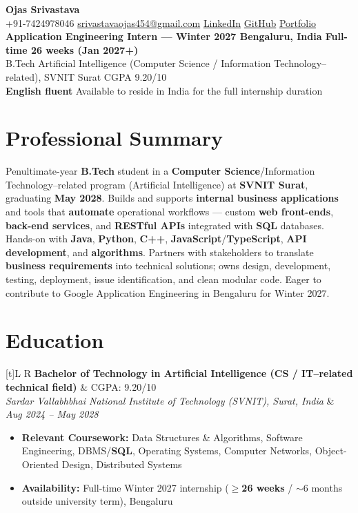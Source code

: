 \documentclass[a4paper,10pt]{article}
\newcommand{\resumeSubheading}[4]{%
  \vspace{0.4mm}
  \noindent
  \begin{tabularx}{\textwidth}[t]{L R}
    \textbf{#1} & #4 \\
    \textit{#3} & \textit{#2} \\
  \end{tabularx}
  \vspace{-0.3mm}%
}
\begin{document}
\selectfont

\begin{center}
  {\LARGE \textbf{Ojas Srivastava}} \\[0.8mm]
  \small
  +91-7424978046 \textbar{}
  \href{mailto:srivastavaojas454@gmail.com}{srivastavaojas454@gmail.com} \textbar{}
  \href{https://linkedin.com/in/ojas-srivastava05}{LinkedIn} \textbar{}
  \href{https://github.com/Ojas-Srivastava05}{GitHub} \textbar{}
  \href{https://ojas-srivastava.vercel.app}{Portfolio} \\[0.4mm]
  \textbf{Application Engineering Intern --- Winter 2027 \textbar{} Bengaluru, India \textbar{} Full-time 26 weeks (Jan 2027+)} \\[0.25mm]
  B.Tech Artificial Intelligence (Computer Science / Information Technology--related), SVNIT Surat \textbar{} CGPA 9.20/10 \\[0.2mm]
  \textbf{English fluent} \textbar{} Available to reside in India for the full internship duration
\end{center}

\vspace{-0.6mm}

\section{Professional Summary}
\small
Penultimate-year \textbf{B.Tech} student in a \textbf{Computer Science}/Information Technology--related program (Artificial Intelligence) at \textbf{SVNIT Surat}, graduating \textbf{May 2028}. Builds and supports \textbf{internal business applications} and tools that \textbf{automate} operational workflows --- custom \textbf{web front-ends}, \textbf{back-end services}, and \textbf{RESTful APIs} integrated with \textbf{SQL} databases. Hands-on with \textbf{Java}, \textbf{Python}, \textbf{C++}, \textbf{JavaScript}/\textbf{TypeScript}, \textbf{API development}, and \textbf{algorithms}. Partners with stakeholders to translate \textbf{business requirements} into technical solutions; owns design, development, testing, deployment, issue identification, and clean modular code. Eager to contribute to Google Application Engineering in Bengaluru for Winter 2027.

\section{Education}
\small
\resumeSubheading
  {Bachelor of Technology in Artificial Intelligence (CS / IT--related technical field)}{Aug 2024 -- May 2028}
  {Sardar Vallabhbhai National Institute of Technology (SVNIT), Surat, India}{CGPA: 9.20/10}
\begin{itemize}
  \item \textbf{Relevant Coursework:} Data Structures \& Algorithms, Software Engineering, DBMS/\textbf{SQL}, Operating Systems, Computer Networks, Object-Oriented Design, Distributed Systems
  \item \textbf{Availability:} Full-time Winter 2027 internship (\textbf{$\geq$26 weeks} / $\sim$6 months outside university term), Bengaluru
\end{itemize}
\end{document}
